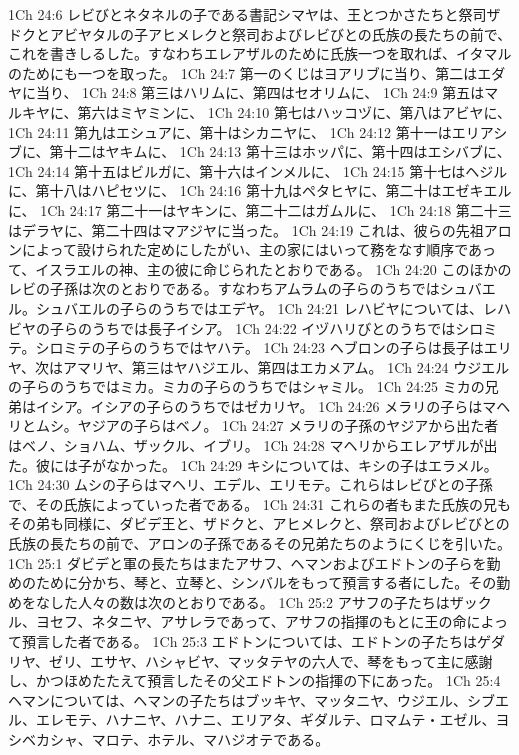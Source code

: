 1Ch 24:6  レビびとネタネルの子である書記シマヤは、王とつかさたちと祭司ザドクとアビヤタルの子アヒメレクと祭司およびレビびとの氏族の長たちの前で、これを書きしるした。すなわちエレアザルのために氏族一つを取れば、イタマルのためにも一つを取った。
1Ch 24:7  第一のくじはヨアリブに当り、第二はエダヤに当り、
1Ch 24:8  第三はハリムに、第四はセオリムに、
1Ch 24:9  第五はマルキヤに、第六はミヤミンに、
1Ch 24:10  第七はハッコヅに、第八はアビヤに、
1Ch 24:11  第九はエシュアに、第十はシカニヤに、
1Ch 24:12  第十一はエリアシブに、第十二はヤキムに、
1Ch 24:13  第十三はホッパに、第十四はエシバブに、
1Ch 24:14  第十五はビルガに、第十六はインメルに、
1Ch 24:15  第十七はヘジルに、第十八はハピセツに、
1Ch 24:16  第十九はペタヒヤに、第二十はエゼキエルに、
1Ch 24:17  第二十一はヤキンに、第二十二はガムルに、
1Ch 24:18  第二十三はデラヤに、第二十四はマアジヤに当った。
1Ch 24:19  これは、彼らの先祖アロンによって設けられた定めにしたがい、主の家にはいって務をなす順序であって、イスラエルの神、主の彼に命じられたとおりである。
1Ch 24:20  このほかのレビの子孫は次のとおりである。すなわちアムラムの子らのうちではシュバエル。シュバエルの子らのうちではエデヤ。
1Ch 24:21  レハビヤについては、レハビヤの子らのうちでは長子イシア。
1Ch 24:22  イヅハリびとのうちではシロミテ。シロミテの子らのうちではヤハテ。
1Ch 24:23  ヘブロンの子らは長子はエリヤ、次はアマリヤ、第三はヤハジエル、第四はエカメアム。
1Ch 24:24  ウジエルの子らのうちではミカ。ミカの子らのうちではシャミル。
1Ch 24:25  ミカの兄弟はイシア。イシアの子らのうちではゼカリヤ。
1Ch 24:26  メラリの子らはマヘリとムシ。ヤジアの子らはベノ。
1Ch 24:27  メラリの子孫のヤジアから出た者はベノ、ショハム、ザックル、イブリ。
1Ch 24:28  マヘリからエレアザルが出た。彼には子がなかった。
1Ch 24:29  キシについては、キシの子はエラメル。
1Ch 24:30  ムシの子らはマヘリ、エデル、エリモテ。これらはレビびとの子孫で、その氏族によっていった者である。
1Ch 24:31  これらの者もまた氏族の兄もその弟も同様に、ダビデ王と、ザドクと、アヒメレクと、祭司およびレビびとの氏族の長たちの前で、アロンの子孫であるその兄弟たちのようにくじを引いた。
1Ch 25:1  ダビデと軍の長たちはまたアサフ、ヘマンおよびエドトンの子らを勤めのために分かち、琴と、立琴と、シンバルをもって預言する者にした。その勤めをなした人々の数は次のとおりである。
1Ch 25:2  アサフの子たちはザックル、ヨセフ、ネタニヤ、アサレラであって、アサフの指揮のもとに王の命によって預言した者である。
1Ch 25:3  エドトンについては、エドトンの子たちはゲダリヤ、ゼリ、エサヤ、ハシャビヤ、マッタテヤの六人で、琴をもって主に感謝し、かつほめたたえて預言したその父エドトンの指揮の下にあった。
1Ch 25:4  ヘマンについては、ヘマンの子たちはブッキヤ、マッタニヤ、ウジエル、シブエル、エレモテ、ハナニヤ、ハナニ、エリアタ、ギダルテ、ロマムテ・エゼル、ヨシベカシャ、マロテ、ホテル、マハジオテである。
